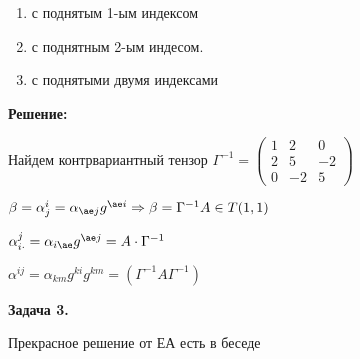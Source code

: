 \begin{enumerate}
    \item с поднятым 1-ым индексом
    \item с поднятным 2-ым индесом.
    \item с поднятыми двумя индексами
\end{enumerate}

\textbf{Решение:}

Найдем контрвариантный тензор $\Gamma^{-1} = \begin{pmatrix}
1 & 2 & 0 \\
2 & 5 & -2 \\
0 & -2 & 5
\end{pmatrix}$

$\beta = \alpha_j^i = \alpha_{\ae j}g^{\ae i} \Rightarrow \beta = \Gamma^{-1} A \in T(1,1)$

$\alpha^j_{i 
\cdot} = \alpha_{i \ae} g^{\ae j} = A \cdot \Gamma^{-1}$

$\alpha^{ij} = \alpha_{km}g^{ki}g^{km} = (\Gamma^{-1}A \Gamma^{-1})$



\textbf{Задача 3.}

Прекрасное решение от ЕА есть в беседе